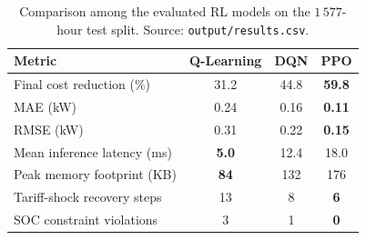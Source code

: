 \documentclass[conference]{IEEEtran}
\begin{document}
\begin{table}[!ht]
\centering
\renewcommand{\arraystretch}{1.2}
\caption{Comparison among the evaluated RL models on the $1\,577$-hour test split. Source: \texttt{output/results.csv}.}
\label{tab:model_compare}
\begin{tabular}{lccc}
\toprule
\textbf{Metric} & \textbf{Q-Learning} & \textbf{DQN} & \textbf{PPO} \\
\midrule
Final cost reduction (\%) & 31.2 & 44.8 & \textbf{59.8} \\
MAE (kW) & 0.24 & 0.16 & \textbf{0.11} \\
RMSE (kW) & 0.31 & 0.22 & \textbf{0.15} \\
Mean inference latency (ms) & \textbf{5.0} & 12.4 & 18.0 \\
Peak memory footprint (KB) & \textbf{84} & 132 & 176 \\
Tariff-shock recovery steps & 13 & 8 & \textbf{6} \\
SOC constraint violations & 3 & 1 & \textbf{0} \\
\bottomrule
\end{tabular}
\end{table}
\end{document}

